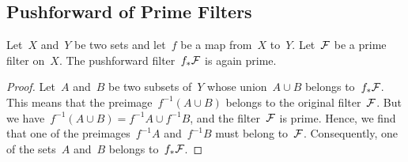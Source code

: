\subsection{Pushforward of Prime Filters}

\begin{proposition}
	Let~$X$ and~$Y$ be two sets and let~$f$ be a map from~$X$ to~$Y$.
	Let~$\mathcal{F}$ be a prime filter on~$X$.
	The pushforward filter~$f_* \mathcal{F}$ is again prime.
\end{proposition}

\begin{proof}
	Let~$A$ and~$B$ be two subsets of~$Y$ whose union~$A ∪ B$ belongs to~$f_* \mathcal{F}$.
	This means that the preimage~$f^{-1} (A ∪ B)$ belongs to the original filter~$\mathcal{F}$.
	But we have~$f^{-1} (A ∪ B) = f^{-1} A ∪ f^{-1} B$, and the filter~$\mathcal{F}$ is prime.
	Hence, we find that one of the preimages~$f^{-1} A$ and~$f^{-1} B$ must belong to~$\mathcal{F}$.
	Consequently, one of the sets~$A$ and~$B$ belongs to~$f_* \mathcal{F}$.
\end{proof}
